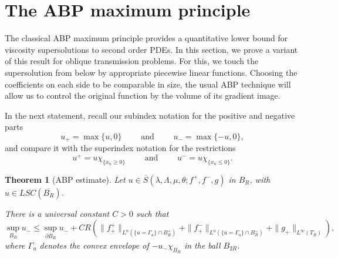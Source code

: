 \documentclass[letter,11pt]{amsart}
\newcommand{\chara}[1]{\chi_{#1}}
\newcommand{\lowers}{LSC}
\newtheorem{thm}{Theorem}[section]
\theoremstyle{definition}
\numberwithin{equation}{section}
\begin{document}

\medskip

\section{The ABP maximum principle}
\label{sec:abp}

The classical ABP maximum principle provides a quantitative lower bound for viscosity supersolutions to second order PDEs.
In this section, we prove a variant of this result for oblique transmission problems.
For this, we touch the supersolution from below by appropriate piecewise linear functions.
Choosing the coefficients on each side to be comparable in size, the usual ABP technique will allow us to control the original function by the volume of its gradient image.

\medskip

In the next statement, recall our subindex notation for the positive and negative parts
\[
u_{+} = \max\{u, 0\}
\qquad \text{ and }
\qquad 
u_{-} = \max\{- u, 0\},
\]
and compare it with the superindex notation for the restrictions
\[
u^{+} = u \chara{\{x_n \geq 0\}} \qquad \text{ and } \qquad u^{-} = u \chara{\{x_n \leq 0\}}.
\]

\medskip

\begin{thm}[ABP estimate]
\label{thm:abp}
Let $u \in \overline{S}(\lambda,\Lambda,\mu, \theta; f^{+}, f^{-}, g)$ in $B_R$, with $u \in \lowers(\overline{B_R})$.

There is a universal constant $C > 0$ such that
\[
\sup_{B_R} u_{-} \leq \sup_{\partial B_R} u_{-} + C R \left( 
 \|f^{+}_{+}\|_{L^{n}(\{u = \Gamma_u\} \cap B_R^{+})} + \|f^{-}_{+}\|_{L^{n}(\{u = \Gamma_u\} \cap B_R^{-})}+ \|g_{+}\|_{L^{\infty}(T_R)}
 \right),
\]
where $\Gamma_u$ denotes the convex envelope of $- u_{-} \chara{B_R}$ in the ball $B_{2R}$.
\end{thm}
\end{document}
